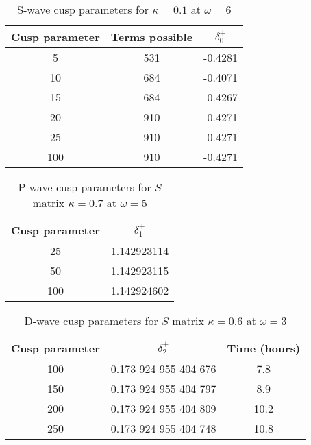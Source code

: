 \documentclass[Dissertation.tex]{subfiles}
\begin{document}
\begin{table}
\centering
\begin{tabular}{c c c}
\toprule
Cusp parameter & Terms possible & $\delta_0^+$ \\
\midrule
 5 & 531 & -0.4281 \\
10 & 684 & -0.4071 \\
15 & 684 & -0.4267 \\
20 & 910 & -0.4271 \\
25 & 910 & -0.4271 \\
100 & 910 & -0.4271 \\
\bottomrule
\end{tabular}
\caption{S-wave cusp parameters for $\kappa = 0.1$ at $\omega = 6$}
\label{tab:SWaveCuspParameters}
\end{table}

\begin{table}
\centering
\begin{tabular}{c c}
\toprule
Cusp parameter & $\delta_1^+$ \\
\midrule
 25 & 1.142923114 \\
 50 & 1.142923115 \\
100 & 1.142924602 \\
\bottomrule
\end{tabular}
\caption{P-wave cusp parameters for $S$ matrix $\kappa = 0.7$ at $\omega = 5$}
\label{tab:PWaveCuspParameters}
\end{table}


\begin{table}
\centering
\begin{tabular}{c c c}
\toprule
Cusp parameter & $\delta_2^+$ & Time (hours) \\
\midrule
100 & 0.173 924 955 404 676 & 7.8 \\
150 & 0.173 924 955 404 797 & 8.9 \\
200 & 0.173 924 955 404 809 & 10.2 \\
250 & 0.173 924 955 404 748 & 10.8 \\
\bottomrule
\end{tabular}
\caption{D-wave cusp parameters for $S$ matrix $\kappa = 0.6$ at $\omega = 3$}
\label{tab:DWaveCuspParameters}
\end{table}
\end{document}
